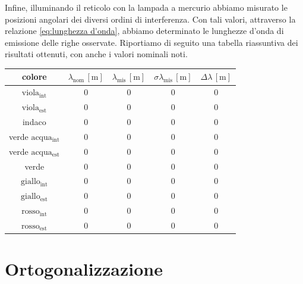 \documentclass{article}
\begin{document}
        Infine, illuminando il reticolo con la lampada a mercurio abbiamo misurato le posizioni angolari dei diversi ordini di interferenza. 
        Con tali valori, attraverso la relazione \ref{eq:lunghezza d'onda}, abbiamo determinato le lunghezze d'onda di emissione delle righe osservate. 
        Riportiamo di seguito una tabella riassuntiva dei risultati ottenuti, con anche i valori nominali noti. \\  

        \begin{table}[H]
            \centering
            \begin{tabular}{|c|c|c|c|c|}
                \toprule 
                colore & 
                $ \lambda_{\mathrm{nom}} \, \mathrm{[m]} $ & 
                $ \lambda_{\mathrm{mis}} \, \mathrm{[m]} $ & 
                $ \sigma \lambda_{\mathrm{mis}} \, \mathrm{[m]}$ & 
                $ \Delta \lambda \, \mathrm{[m]} $ \\

                \midrule
                $ \mathrm{viola_{int}} $        & 0 & 0 & 0 & 0 \\
                $ \mathrm{viola_{est}} $        & 0 & 0 & 0 & 0 \\
                indaco                          & 0 & 0 & 0 & 0 \\
                verde $ \mathrm{acqua_{int}} $  & 0 & 0 & 0 & 0 \\  
                verde $ \mathrm{acqua_{est}} $  & 0 & 0 & 0 & 0 \\
                verde                           & 0 & 0 & 0 & 0 \\
                $ \mathrm{giallo_{int}} $       & 0 & 0 & 0 & 0 \\
                $ \mathrm{giallo_{est}} $       & 0 & 0 & 0 & 0 \\
                $ \mathrm{rosso_{int}} $        & 0 & 0 & 0 & 0 \\
                $ \mathrm{rosso_{est}} $        & 0 & 0 & 0 & 0 \\

                \bottomrule
            \end{tabular}
        \end{table}

        
    \section{Ortogonalizzazione}
\end{document}
